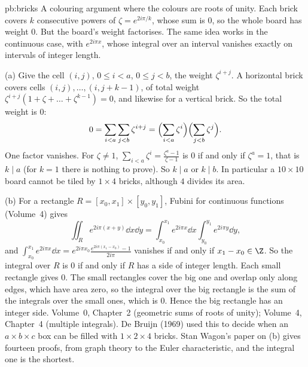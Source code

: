 \begin{solution}{pb:bricks}
\idea A colouring argument where the colours are roots of unity. Each brick covers $k$ consecutive powers of
$\zeta=e^{2i\pi/k}$, whose sum is $0$, so the whole board has weight $0$. But the board's weight factorises. The same idea
works in the continuous case, with $e^{2i\pi x}$, whose integral over an interval vanishes exactly on intervals of integer
length.

\writeup (a) Give the cell $(i,j)$, $0\le i<a$, $0\le j<b$, the weight $\zeta^{i+j}$. A horizontal brick covers cells
$(i,j),\dots,(i,j+k-1)$, of total weight $\zeta^{i+j}(1+\zeta+\dots+\zeta^{k-1})=0$, and likewise for a vertical brick. So the
total weight is $0$:
\[
0=\sum_{i<a}\sum_{j<b}\zeta^{i+j}=\Bigl(\sum_{i<a}\zeta^i\Bigr)\Bigl(\sum_{j<b}\zeta^j\Bigr).
\]
One factor vanishes. For $\zeta\ne1$, $\sum_{i<a}\zeta^i=\frac{\zeta^a-1}{\zeta-1}$ is $0$ if and only if $\zeta^a=1$, that is
$k\mid a$ (for $k=1$ there is nothing to prove). So $k\mid a$ or $k\mid b$. In particular a $10\times10$ board cannot be tiled
by $1\times4$ bricks, although $4$ divides its area.

(b) For a rectangle $R=[x_0,x_1]\times[y_0,y_1]$, Fubini for continuous functions (Volume~4) gives
\[
\iint_Re^{2i\pi(x+y)}\dd x\dd y=\int_{x_0}^{x_1}e^{2i\pi x}\dd x\int_{y_0}^{y_1}e^{2i\pi y}\dd y,
\]
and $\int_{x_0}^{x_1}e^{2i\pi x}\dd x=e^{2i\pi x_0}\frac{e^{2i\pi(x_1-x_0)}-1}{2i\pi}$ vanishes if and only if $x_1-x_0\in\Z$. So
the integral over $R$ is $0$ if and only if $R$ has a side of integer length. Each small rectangle gives $0$. The small
rectangles cover the big one and overlap only along edges, which have area zero, so the integral over the big rectangle is
the sum of the integrals over the small ones, which is $0$. Hence the big rectangle has an integer side.
\tools Volume~0, Chapter~2 (geometric sums of roots of unity); Volume~4, Chapter~4 (multiple integrals).
\leads De Bruijn (1969) used this to decide when an $a\times b\times c$ box can be filled with $1\times2\times4$ bricks.
Stan Wagon's paper on (b) gives fourteen proofs, from graph theory to the Euler characteristic, and the integral one is
the shortest.
\end{solution}

